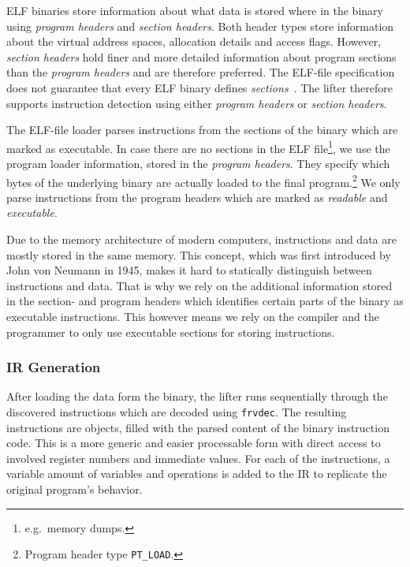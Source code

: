 \documentclass[course=eragp]{aspdoc}
\begin{document}
ELF binaries store information about what data is stored where in the binary using \textit{program
    headers} and \textit{section headers}. Both header types store information about the virtual address
spaces, allocation details and access flags. However, \textit{section headers} hold finer and more detailed information
about program sections than the \textit{program headers} and are therefore preferred. The ELF-file specification does not guarantee that every ELF
binary defines \textit{sections}~\cite{elf_spec}. The lifter therefore supports instruction
detection using either \textit{program headers} or \textit{section headers}.

\par

The ELF-file loader parses instructions from the sections of the binary
which are marked as executable. In case there are no sections in the ELF file\footnote{e.g.\ memory dumps.}, we use the
program loader information, stored in the \emph{program headers}. They
specify which bytes of the underlying binary are actually loaded to the final program.\footnote{Program header type \texttt{PT\_LOAD}.}
We only parse instructions from the program headers which are marked as \emph{readable} and
\emph{executable}.

\par

Due to the memory architecture of modern computers, instructions and data are mostly stored in the same
memory. This concept, which was first introduced by John von Neumann in 1945\cite{vna}, makes it
hard to statically distinguish between instructions and data. That is why we rely on the additional
information stored in the section- and program headers which identifies certain parts of the binary
as executable instructions. This however means we rely on the compiler and the programmer to only
use executable sections for storing instructions.

\subsubsection{IR Generation}

After loading the data form the binary, the lifter runs sequentially through the discovered
instructions which are decoded using \texttt{frvdec}\cite{frvdec}. The resulting instructions are objects,
filled with the parsed content of the binary instruction code. This is a
more generic and easier processable form with direct access to involved register numbers and
immediate values. For each of the instructions, a variable amount of variables and operations is added to
the IR to replicate the original program's behavior.
\end{document}
